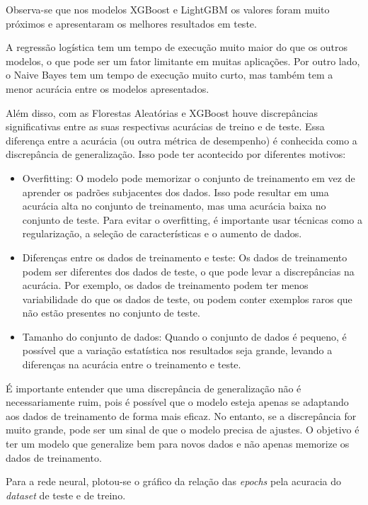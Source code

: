 Observa-se que nos modelos XGBoost e LightGBM os valores foram muito próximos e apresentaram os melhores resultados em teste.

A regressão logística tem um tempo de execução muito maior do que os outros modelos, o que pode ser um fator limitante em muitas aplicações. Por outro lado, o Naive Bayes tem um tempo de execução muito curto, mas também tem a menor acurácia entre os modelos apresentados.

Além disso, com as Florestas Aleatórias e XGBoost houve discrepâncias significativas entre as suas respectivas acurácias de treino e de teste. Essa diferença entre a acurácia (ou outra métrica de desempenho) é conhecida como a discrepância de generalização. Isso pode ter acontecido por diferentes motivos:

\begin{itemize}
    \item Overfitting: O modelo pode memorizar o conjunto de treinamento em vez de aprender os padrões subjacentes dos dados. Isso pode resultar em uma acurácia alta no conjunto de treinamento, mas uma acurácia baixa no conjunto de teste. Para evitar o overfitting, é importante usar técnicas como a regularização, a seleção de características e o aumento de dados.
    \item Diferenças entre os dados de treinamento e teste: Os dados de treinamento podem ser diferentes dos dados de teste, o que pode levar a discrepâncias na acurácia. Por exemplo, os dados de treinamento podem ter menos variabilidade do que os dados de teste, ou podem conter exemplos raros que não estão presentes no conjunto de teste.
    \item Tamanho do conjunto de dados: Quando o conjunto de dados é pequeno, é possível que a variação estatística nos resultados seja grande, levando a diferenças na acurácia entre o treinamento e teste.
\end{itemize}

É importante entender que uma discrepância de generalização não é necessariamente ruim, pois é possível que o modelo esteja apenas se adaptando aos dados de treinamento de forma mais eficaz. No entanto, se a discrepância for muito grande, pode ser um sinal de que o modelo precisa de ajustes. O objetivo é ter um modelo que generalize bem para novos dados e não apenas memorize os dados de treinamento.

Para a rede neural, plotou-se o gráfico da relação das \textit{epochs} pela acuracia do \textit{dataset} de teste e de treino.

